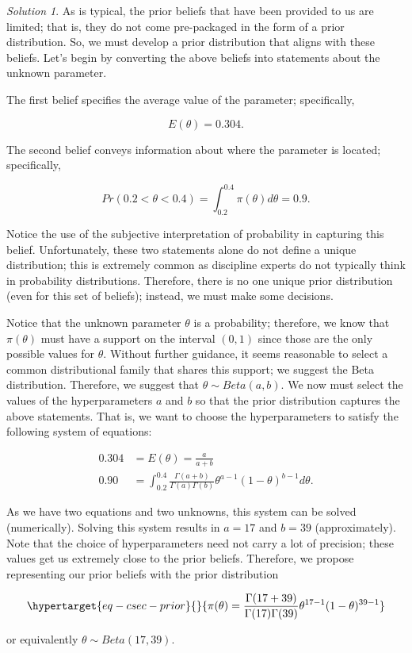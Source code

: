 \documentclass[
  letterpaper,
  DIV=11,
  numbers=noendperiod]{scrreprt}
\theoremstyle{definition}
\theoremstyle{definition}
\theoremstyle{plain}
\theoremstyle{remark}
\newtheorem*{solution}{Solution}
\begin{document}
\begin{solution}

As is typical, the prior beliefs that have been provided to us are
limited; that is, they do not come pre-packaged in the form of a prior
distribution. So, we must develop a prior distribution that aligns with
these beliefs. Let's begin by converting the above beliefs into
statements about the unknown parameter.

The first belief specifies the average value of the parameter;
specifically,

\[E(\theta) = 0.304.\]

The second belief conveys information about where the parameter is
located; specifically,

\[Pr(0.2 < \theta < 0.4) = \int_{0.2}^{0.4} \pi(\theta) d\theta = 0.9.\]

Notice the use of the subjective interpretation of probability in
capturing this belief. Unfortunately, these two statements alone do not
define a unique distribution; this is extremely common as discipline
experts do not typically think in probability distributions. Therefore,
there is no one unique prior distribution (even for this set of
beliefs); instead, we must make some decisions.

Notice that the unknown parameter \(\theta\) is a probability;
therefore, we know that \(\pi(\theta)\) must have a support on the
interval \((0, 1)\) since those are the only possible values for
\(\theta\). Without further guidance, it seems reasonable to select a
common distributional family that shares this support; we suggest the
Beta distribution. Therefore, we suggest that
\(\theta \sim Beta(a, b)\). We now must select the values of the
hyperparameters \(a\) and \(b\) so that the prior distribution captures
the above statements. That is, we want to choose the hyperparameters to
satisfy the following system of equations:

\[
\begin{aligned}
  0.304 &= E(\theta) = \frac{a}{a+b} \\
  0.90 &= \int_{0.2}^{0.4} \frac{\Gamma(a + b)}{\Gamma(a)\Gamma(b)} \theta^{a-1} (1 - \theta)^{b-1} d\theta.
\end{aligned}
\]

As we have two equations and two unknowns, this system can be solved
(numerically). Solving this system results in \(a = 17\) and \(b = 39\)
(approximately). Note that the choice of hyperparameters need not carry
a lot of precision; these values get us extremely close to the prior
beliefs. Therefore, we propose representing our prior beliefs with the
prior distribution

\begin{equation}\protect\hypertarget{eq-csec-prior}{}{\pi(\theta) = \frac{\Gamma(17 + 39)}{\Gamma(17)\Gamma(39)} \theta^{17-1} (1 - \theta)^{39-1}}\label{eq-csec-prior}\end{equation}

or equivalently \(\theta \sim Beta(17, 39)\).

\end{solution}
\end{document}
